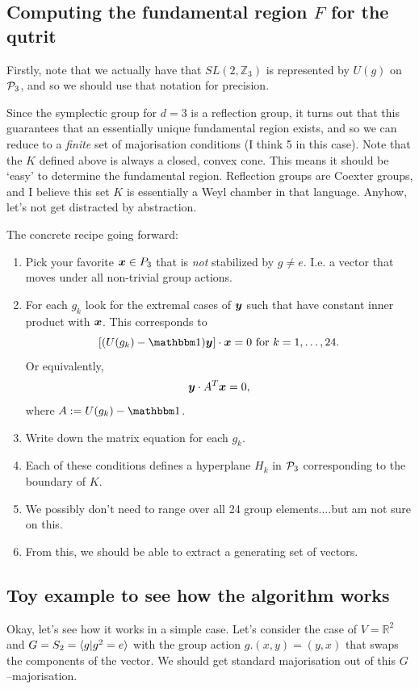 \documentclass[pra,
aps,
twocolumn,
superscriptaddress,
groupedaddress,
nofootinbib,
reprint
]{revtex4-1}
\begin{document}
\subsection{Computing the fundamental region $F$ for the qutrit}
Firstly, note that we actually have that $SL(2, \mathbb{Z}_3)$ is represented by $U(g)$ on $\P_3$, and so we should use that notation for precision.

Since the symplectic group for $d=3$ is a reflection group, it turns out that this guarantees that an essentially unique fundamental region exists, and so we can reduce to a \emph{finite} set of majorisation conditions (I think 5 in this case). Note that the $K$ defined above is always a closed, convex cone. This means it should be `easy' to determine the fundamental region. Reflection groups are Coexter groups, and I believe this set $K$ is essentially a Weyl chamber in that language. Anyhow, let's not get distracted by abstraction.


The concrete recipe going forward:
\begin{enumerate}
\item Pick your favorite $\x \in P_3$ that is \emph{not} stabilized by $g\ne e$. I.e. a vector that moves under all non-trivial group actions.
\item For each $g_k$ look for the extremal cases of $\y$ such that have constant inner product with $\x$. This corresponds to 
\begin{equation}
\left [ (U(g_k) -\I) \y \right ] \cdot \x = 0 \mbox{ for }k=1, \dots ,24.
\end{equation}
Or equivalently,
\begin{equation}
\y \cdot A^T\x = 0,
\end{equation}
where $A := U(g_k) -\I$.
\item Write down the matrix equation for each $g_k$.
\item Each of these conditions defines a hyperplane $H_k$ in $\P_3$ corresponding to the boundary of $K$.
\item We possibly don't need to range over all 24 group elements....but am not sure on this.
\item From this, we should be able to extract a generating set of vectors.
\end{enumerate}

\subsection{Toy example to see how the algorithm works}
Okay, let's see how it works in a simple case. Let's consider the case of $V= \mathbb{R}^2$ and $G=S_2=\<g|g^2=e\>$ with the group action $g.(x,y) = (y,x)$ that swaps the components of the vector. We should get standard majorisation out of this $G$--majorisation.
\end{document}
